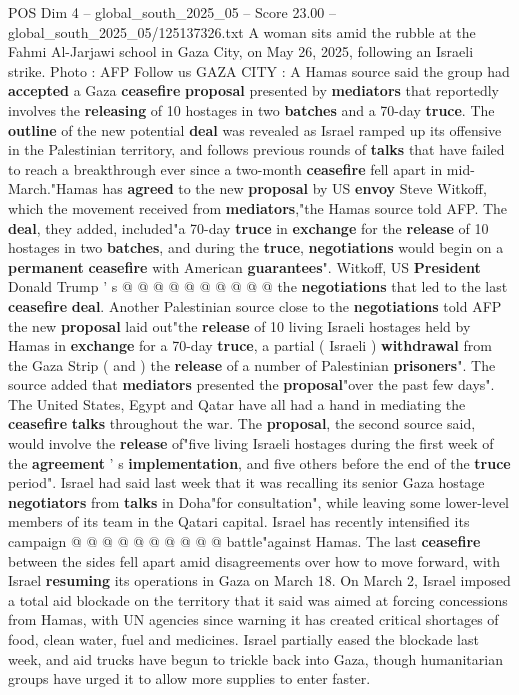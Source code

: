 \begin{textsample}{POS Dim 4 – global\_south\_2025\_05 – Score 23.00 – global\_south\_2025\_05/125137326.txt}  \label{ex:f4_pos_094}
A woman sits amid the rubble at the Fahmi Al-Jarjawi school in Gaza City, on May 26, 2025, following an Israeli strike.
Photo : AFP Follow us GAZA CITY : A Hamas source said the group had \textbf{accepted} a Gaza \textbf{ceasefire} \textbf{proposal} presented by \textbf{mediators} that reportedly involves the \textbf{releasing} of 10 hostages in two \textbf{batches} and a 70-day \textbf{truce}.
The \textbf{outline} of the new potential \textbf{deal} was revealed as Israel ramped up its offensive in the Palestinian territory, and follows previous rounds of \textbf{talks} that have failed to reach a breakthrough ever since a two-month \textbf{ceasefire} fell apart in mid-March."Hamas has \textbf{agreed} to the new \textbf{proposal} by US \textbf{envoy} Steve Witkoff, which the movement received from \textbf{mediators},"the Hamas source told AFP.
The \textbf{deal}, they added, included"a 70-day \textbf{truce} in \textbf{exchange} for the \textbf{release} of 10 hostages in two \textbf{batches}, and during the \textbf{truce}, \textbf{negotiations} would begin on a \textbf{permanent} \textbf{ceasefire} with American \textbf{guarantees}".
Witkoff, US \textbf{President} Donald Trump ' s @ @ @ @ @ @ @ @ @ @ the \textbf{negotiations} that led to the last \textbf{ceasefire} \textbf{deal}.
Another Palestinian source close to the \textbf{negotiations} told AFP the new \textbf{proposal} laid out"the \textbf{release} of 10 living Israeli hostages held by Hamas in \textbf{exchange} for a 70-day \textbf{truce}, a partial ( Israeli ) \textbf{withdrawal} from the Gaza Strip ( and ) the \textbf{release} of a number of Palestinian \textbf{prisoners}".
The source added that \textbf{mediators} presented the \textbf{proposal}"over the past few days".
The United States, Egypt and Qatar have all had a hand in mediating the \textbf{ceasefire} \textbf{talks} throughout the war.
The \textbf{proposal}, the second source said, would involve the \textbf{release} of"five living Israeli hostages during the first week of the \textbf{agreement} ' s \textbf{implementation}, and five others before the end of the \textbf{truce} period".
Israel had said last week that it was recalling its senior Gaza hostage \textbf{negotiators} from \textbf{talks} in Doha"for consultation", while leaving some lower-level members of its team in the Qatari capital.
Israel has recently intensified its campaign @ @ @ @ @ @ @ @ @ @ battle"against Hamas.
The last \textbf{ceasefire} between the sides fell apart amid disagreements over how to move forward, with Israel \textbf{resuming} its operations in Gaza on March 18.
On March 2, Israel imposed a total aid blockade on the territory that it said was aimed at forcing concessions from Hamas, with UN agencies since warning it has created critical shortages of food, clean water, fuel and medicines.
Israel partially eased the blockade last week, and aid trucks have begun to trickle back into Gaza, though humanitarian groups have urged it to allow more supplies to enter faster.


\end{textsample}
